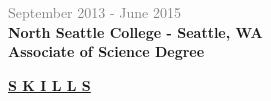 \documentclass[letterpage]{article}
\begin{document}
\begin{minipage}[t]{0.424\linewidth}
\textcolor{gray}{September 2013 - June 2015}\\
\textbf{\textsf{North Seattle College - Seattle, WA}}\\
\textbf{Associate of Science Degree }

\vspace{19px}

\textbf{\fontsize{14px}{1px}\selectfont
  \ul{S K I L L S}
}\\
\vspace{0px}\\
\begin{minipage}[t]{0.01\linewidth}
\end{minipage}
\: %


\end{minipage}
\end{document}
